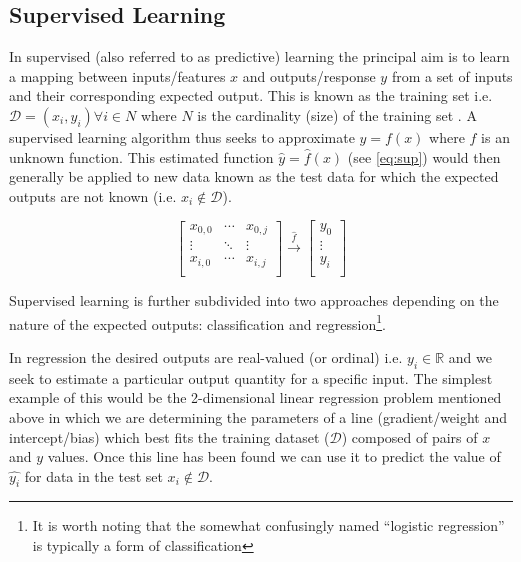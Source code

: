 \subsection{Supervised Learning}

In supervised (also referred to as predictive) learning the principal aim is 
to learn a mapping between inputs/features \(x\) and outputs/response \(y\) from a set of 
inputs and their corresponding expected output.  This is known as the training set 
i.e. \(\mathcal{D} = {(x_{i}, y_{i}) \forall i \in N}\) where \(N\) is 
the cardinality (size) of the training set \citep{Murphy2012}.  
A supervised learning algorithm thus seeks to approximate \(y=f(x)\) where \(f\) is an unknown 
function. This estimated function \(\hat{y} = \hat{f}(x)\) (see \ref{eq:sup}) would then generally
be applied to new data known as the test data for which the expected outputs are not known (i.e. 
\(x_{i} \not \in \mathcal{D}\)).

\[
    \begin{bmatrix}
        x_{0,0} & \cdots & x_{0,j}\\
        \vdots & \ddots & \vdots \\
        x_{i,0} & \cdots & x_{i,j}\\
    \end{bmatrix} \overset{\hat{f}}{\rightarrow} \begin{bmatrix}
        y_{0} \\
        \vdots \\
        y_{i} \\
    \end{bmatrix}
    \label{eq:sup}
\]

Supervised learning is further subdivided into two approaches depending on the nature of the expected
outputs: classification and regression\footnote{It is worth noting that the somewhat confusingly named
    ``logistic regression'' is typically a form of classification}.

In regression the desired outputs are real-valued (or ordinal) i.e. \(y_{i} \in \mathbb{R}\) and we seek to
estimate a particular output quantity for a specific input.
The simplest example of this would be the 2-dimensional linear regression problem mentioned above in which
we are determining the parameters of a line (gradient/weight and intercept/bias) which best fits the training 
dataset (\(\mathcal{D}\)) composed of pairs of \(x\) and \(y\) values.  Once this line has been found we 
can use it to predict the value of \(\hat{y_{i}}\) for data in the test set \(x_{i} \not \in \mathcal{D}\).


